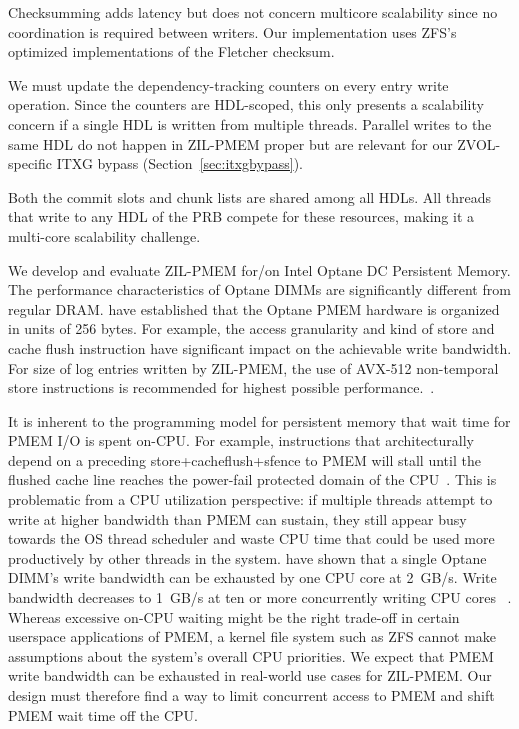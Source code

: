 \documentclass[12pt,a4paper,twoside]{book}
\begin{document}
\begin{description}[noitemsep]
    \item[Checksumming] Checksumming adds latency but does not concern multicore scalability since no coordination is required between writers.
        Our implementation uses ZFS's optimized implementations of the Fletcher checksum.
    \item[Dependency Tracking Counters] We must update the dependency-tracking counters on every entry write operation.
        Since the counters are HDL-scoped, this only presents a scalability concern if a single HDL is written from multiple threads.
        Parallel writes to the same HDL do not happen in ZIL-PMEM proper but are relevant for our ZVOL-specific ITXG bypass (Section~\ref{sec:itxgbypass}).
    \item[Commit Slot Acquisition \& Chunk Replacement]
        Both the commit slots and chunk lists are shared among all HDLs.
        All threads that write to any HDL of the PRB compete for these resources, making it a multi-core scalability challenge.
    \item[Optane Characteristics] We develop and evaluate ZIL-PMEM for/on Intel Optane DC Persistent Memory.
        The performance characteristics of Optane DIMMs are significantly different from regular DRAM.
        \citeauthor{yangEmpiricalGuideBehavior2020} have established that the Optane PMEM hardware is organized in units of 256 bytes.
        For example, the access granularity and kind of store and cache flush instruction have significant impact on the achievable write bandwidth.
        For size of log entries written by ZIL-PMEM, the use of  AVX-512 non-temporal store instructions is recommended for highest possible performance.~\cite{yangEmpiricalGuideBehavior2020}.
    \item[PMEM Bandwidth Limits \& Multicore Scalability]
        It is inherent to the programming model for persistent memory that wait time for PMEM I/O is spent on-CPU.
        For example, instructions that architecturally depend on a preceding store+cacheflush+sfence to PMEM will stall until the flushed cache line reaches the power-fail protected domain of the CPU~\cite{Scargall2020}.
        This is problematic from a CPU utilization perspective:
        if multiple threads attempt to write at higher bandwidth than PMEM can sustain, they still appear busy towards the OS thread scheduler and waste CPU time that could be used more productively by other threads in the system.
        \citeauthor{yangEmpiricalGuideBehavior2020} have shown that a single Optane DIMM's write bandwidth can be exhausted by one CPU core at 2~GB/s.
        Write bandwidth decreases to 1~GB/s at ten or more concurrently writing CPU cores ~\cite{yangEmpiricalGuideBehavior2020}.
        Whereas excessive on-CPU waiting might be the right trade-off in certain userspace applications of PMEM, a kernel file system such as ZFS cannot make assumptions about the system's overall CPU priorities.
        We expect that PMEM write bandwidth can be exhausted in real-world use cases for ZIL-PMEM.
        Our design must therefore find a way to limit concurrent access to PMEM and shift PMEM wait time off the CPU.
\end{description}
\end{document}
